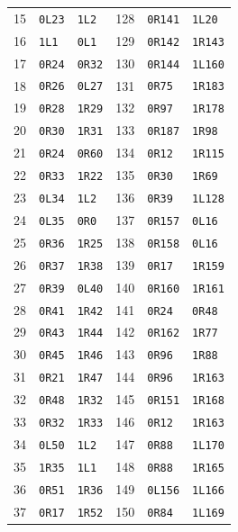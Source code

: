 \begin{longtable}{@{}rll@{\qquad\qquad}rll@{}}
15 & \texttt{0L23} & \texttt{1L2} & 128 & \texttt{0R141} & \texttt{1L20}\\
16 & \texttt{1L1} & \texttt{0L1} & 129 & \texttt{0R142} & \texttt{1R143}\\
17 & \texttt{0R24} & \texttt{0R32} & 130 & \texttt{0R144} & \texttt{1L160}\\
18 & \texttt{0R26} & \texttt{0L27} & 131 & \texttt{0R75} & \texttt{1R183}\\
19 & \texttt{0R28} & \texttt{1R29} & 132 & \texttt{0R97} & \texttt{1R178}\\
20 & \texttt{0R30} & \texttt{1R31} & 133 & \texttt{0R187} & \texttt{1R98}\\
21 & \texttt{0R24} & \texttt{0R60} & 134 & \texttt{0R12} & \texttt{1R115}\\
22 & \texttt{0R33} & \texttt{1R22} & 135 & \texttt{0R30} & \texttt{1R69}\\
23 & \texttt{0L34} & \texttt{1L2} & 136 & \texttt{0R39} & \texttt{1L128}\\
24 & \texttt{0L35} & \texttt{0R0} & 137 & \texttt{0R157} & \texttt{0L16}\\
25 & \texttt{0R36} & \texttt{1R25} & 138 & \texttt{0R158} & \texttt{0L16}\\
26 & \texttt{0R37} & \texttt{1R38} & 139 & \texttt{0R17} & \texttt{1R159}\\
27 & \texttt{0R39} & \texttt{0L40} & 140 & \texttt{0R160} & \texttt{1R161}\\
28 & \texttt{0R41} & \texttt{1R42} & 141 & \texttt{0R24} & \texttt{0R48}\\
29 & \texttt{0R43} & \texttt{1R44} & 142 & \texttt{0R162} & \texttt{1R77}\\
30 & \texttt{0R45} & \texttt{1R46} & 143 & \texttt{0R96} & \texttt{1R88}\\
31 & \texttt{0R21} & \texttt{1R47} & 144 & \texttt{0R96} & \texttt{1R163}\\
32 & \texttt{0R48} & \texttt{1R32} & 145 & \texttt{0R151} & \texttt{1R168}\\
33 & \texttt{0R32} & \texttt{1R33} & 146 & \texttt{0R12} & \texttt{1R163}\\
34 & \texttt{0L50} & \texttt{1L2} & 147 & \texttt{0R88} & \texttt{1L170}\\
35 & \texttt{1R35} & \texttt{1L1} & 148 & \texttt{0R88} & \texttt{1R165}\\
36 & \texttt{0R51} & \texttt{1R36} & 149 & \texttt{0L156} & \texttt{1L166}\\
37 & \texttt{0R17} & \texttt{1R52} & 150 & \texttt{0R84} & \texttt{1L169}\\

\end{longtable}
